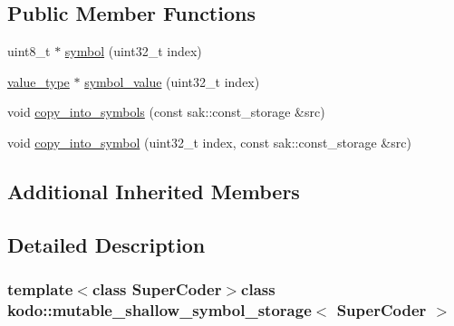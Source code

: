 \subsection*{Public Member Functions}
\begin{DoxyCompactItemize}
\item 
uint8\-\_\-t $\ast$ \hyperlink{classkodo_1_1mutable__shallow__symbol__storage_abd61c6566e00211fe3d8f798df25dbf6}{symbol} (uint32\-\_\-t index)
\begin{DoxyCompactList}\small\item\em \end{DoxyCompactList}\item 
\hyperlink{classkodo_1_1mutable__shallow__symbol__storage_a9ff10d29f7c81440e2e73cbcdff94d46}{value\-\_\-type} $\ast$ \hyperlink{classkodo_1_1mutable__shallow__symbol__storage_ac850d44ab47ac1f800275a8570864d66}{symbol\-\_\-value} (uint32\-\_\-t index)
\begin{DoxyCompactList}\small\item\em \end{DoxyCompactList}\item 
void \hyperlink{classkodo_1_1mutable__shallow__symbol__storage_a7a8da1c9269d276967e2945e7c78ecea}{copy\-\_\-into\-\_\-symbols} (const sak\-::const\-\_\-storage \&src)
\begin{DoxyCompactList}\small\item\em \end{DoxyCompactList}\item 
void \hyperlink{classkodo_1_1mutable__shallow__symbol__storage_a73c8d359c2fd3f52d4ca45f67d74ec0d}{copy\-\_\-into\-\_\-symbol} (uint32\-\_\-t index, const sak\-::const\-\_\-storage \&src)
\begin{DoxyCompactList}\small\item\em \end{DoxyCompactList}\end{DoxyCompactItemize}
\subsection*{Additional Inherited Members}


\subsection{Detailed Description}
\subsubsection*{template$<$class Super\-Coder$>$class kodo\-::mutable\-\_\-shallow\-\_\-symbol\-\_\-storage$<$ Super\-Coder $>$}

